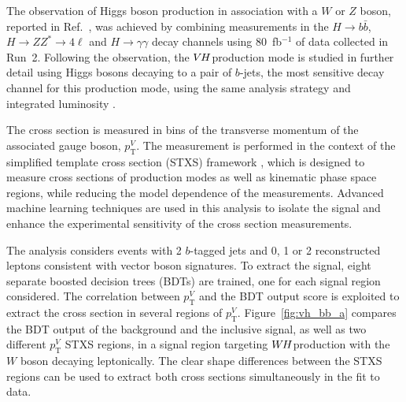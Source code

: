 \documentclass{moriond}
\def\wh{\texorpdfstring{\ensuremath{W\kern -0.1em H}\xspace}{WH\xspace}}
\def\vh{\texorpdfstring{\ensuremath{V\kern -0.1em H}\xspace}{VH\xspace}}
\begin{document}
The observation of Higgs boson production in association with a $W$ or $Z$ boson, reported in
Ref.~\cite{HIGG-2018-04}, was achieved by combining measurements in the $H{\rightarrow}b\bar b$,
$H{\rightarrow}ZZ^*{\rightarrow}4\ell$ and $H{\rightarrow}\gamma\gamma$ decay channels using
80~fb$^{-1}$ of data collected in Run~2.
Following the observation, the \vh production mode is studied in further detail using Higgs bosons
decaying to a pair of $b$-jets, the most sensitive decay channel for this production mode,
using the same analysis strategy and integrated luminosity \cite{Aaboud:2019nan}.

The cross section is measured in bins of the transverse momentum of the associated gauge boson,
$p^{V}_\mathrm{T}$.
The measurement is performed in the context of the simplified template cross section
(STXS) framework \cite{deFlorian:2016spz,Badger:2016bpw},
which is designed to measure cross sections of production modes as well as kinematic phase space
regions, while reducing the model dependence of the measurements.
Advanced machine learning techniques are used in this analysis to isolate the signal and enhance the experimental
sensitivity of the cross section measurements.

The analysis considers events with 2 $b$-tagged jets and 0, 1 or 2 reconstructed leptons consistent
with vector boson signatures. To extract the signal, eight separate boosted decision trees (BDTs)
are trained, one for each signal region considered.
The correlation between $p^{V}_\mathrm{T}$ and the BDT output score is exploited
to extract the cross section in several regions of $p^{V}_\mathrm{T}$.
Figure~\ref{fig:vh_bb_a} compares the BDT output of the background and the inclusive signal,
as well as two different $p^{V}_\mathrm{T}$
STXS regions, in a signal region targeting \wh production with the $W$ boson decaying leptonically.
The clear shape differences between the STXS regions can be used to
extract both cross sections simultaneously in the fit to data.
\end{document}
